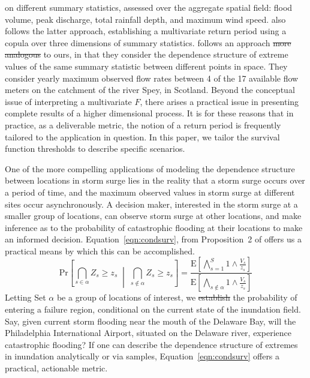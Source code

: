     on different summary statistics, assessed over the aggregate spatial field: flood volume, 
    peak discharge, total rainfall depth, and maximum wind speed.  \cite{graler2013} also follows the latter 
    approach, establishing a multivariate return period using a copula over three dimensions of summary statistics.
    \cite{salvadori2010} follows an approach \st{more analogous}  to ours, in that they consider the dependence 
    structure of extreme values of the same summary statistic between different points in space.  They
    consider yearly maximum observed flow rates between 4 of the 17 available flow meters on the catchment 
    of the river Spey, in Scotland.  
    Beyond the conceptual issue of interpreting a multivariate $F$, there arises a practical issue in presenting
    complete results of a higher dimensional process.
    It is for these reasons that in practice, as a deliverable metric, the notion of a return period is
    frequently tailored to the application in question.  In this paper, we tailor the survival function
    thresholds to describe specific scenarios. 

One of the more compelling applications of modeling the dependence structure between locations in 
    storm surge lies in the reality that a storm surge occurs over a period of time, and the 
    maximum observed values in storm surge at different sites occur asynchronously.  A decision maker,
    interested in the storm surge at a smaller group of locations, can observe storm surge at other
    locations, and make inference as to the probability of catastrophic flooding at their locations
    to make an informed decision.
    Equation~\eqref{eqn:condsurv}, from Proposition~2 of \cite{trubey:pg} offers us a practical means
    by which this can be accomplished.
    \begin{equation}
        \label{eqn:condsurv}
        \text{Pr}\left[\bigcap_{s\in\alpha}Z_s \geq z_s\;\middle|\;\bigcap_{s\not\in\alpha}Z_s \geq z_s\right] =
        \frac{
            \text{E}\left[\bigwedge_{s=1}^S 1\wedge \frac{V_s}{z_s}\right]
        }{
            \text{E}\left[\bigwedge_{s\not\in\alpha} 1\wedge \frac{V_s}{z_s}\right]
        }
    \end{equation}
    Letting Set $\alpha$ be a group of locations of interest, we \st{establish}  the probability of
    entering a failure region, conditional on the current state of the inundation field.  
    Say, given current storm flooding near the mouth of the Delaware Bay, will the 
    Philadelphia International Airport, situated on the Delaware river, experience catastrophic flooding?  
    If one can describe the dependence structure of extremes in inundation analytically or via samples,
    Equation~\ref{eqn:condsurv} offers a practical, actionable metric.

